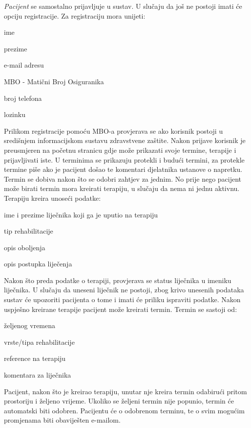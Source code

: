 		\textit{Pacijent} se samostalno prijavljuje u sustav. U slučaju da još ne postoji imati će opciju registracije. Za registraciju mora unijeti: 
		\begin{packed_item}
			\item ime
			\item prezime
			\item e-mail adresu
			\item MBO - Matični Broj Osiguranika
			\item broj telefona
			\item lozinku
		\end{packed_item}
		Prilikom registracije pomoću MBO-a provjerava se ako korisnik postoji u središnjem informacijskom sustavu zdravstvene zaštite.
		Nakon prijave korisnik je preusmjeren na početnu stranicu gdje može prikazati svoje termine, terapije i prijavljivati iste. U terminima se prikazuju protekli i budući termini, za protekle termine piše ako je pacijent došao te komentari djelatnika ustanove o napretku. Termin se dobiva nakon što se odobri zahtjev za jednim. No prije nego pacijent može birati termin mora kreirati terapiju, u slučaju da nema ni jednu aktivnu. Terapiju kreira unoseći podatke:
		\begin{packed_item}
			\item ime i prezime liječnika koji ga je uputio na terapiju
			\item tip rehabilitacije
			\item opis oboljenja 
			\item opis postupka liječenja
		\end{packed_item}
		Nakon što preda podatke o terapiji, provjerava se status liječnika u imeniku liječnika. U slučaju da uneseni liječnik ne postoji, zbog krivo unesenih podataka sustav će upozoriti pacijenta o tome i imati će priliku ispraviti podatke. Nakon uspješno kreirane terapije pacijent može kreirati termin. 
		Termin se sastoji od:
		\begin{packed_item}
			\item željenog vremena 
			\item vrste/tipa rehabilitacije
			\item reference na terapiju
			\item komentara za liječnika
		\end{packed_item}
		Pacijent, nakon što je kreirao terapiju, unutar nje kreira termin odabirući pritom prostoriju i željeno vrijeme. Ukoliko se željeni termin nije popunio, termin će automatski biti odobren. Pacijentu će o odobrenom terminu, te o svim mogućim promjenama biti obaviješten e-mailom.
		
